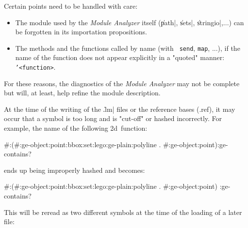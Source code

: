 

Certain points need to be handled with care:

\begin{itemize}

\item The module used by the {\em Module Analyzer} itself
(\|path|, \|sets|, \|stringio|,...) 
can be forgotten in its importation propositions.

\item The methods and the functions called by name (with {\tt
send}, {\tt map}, ...), if the name of the function 
does not appear explicitly in a "quoted" manner:  {\tt '<function>}.

\end{itemize}

For these reasons, the diagnostics of the {\em Module Analyzer} 
may not be complete but will, at least, help refine the module description.





At the time of the writing of the \|.lm| files or the reference bases (.ref), it may occur that a symbol is too long and is "cut-off" or hashed incorrectly.
For example, the name of the following \Masai2d\ function:

\begin{Longcode*}
#:(#:ge-object:point:bbox:set:lego:ge-plain:polyline . #:ge-object:point):ge-contains?
\end{Longcode*}

ends up being improperly hashed and becomes:

\begin{Longcode*}
#:(#:ge-object:point:bbox:set:lego:ge-plain:polyline . #:ge-object:point)
:ge-contains?
\end{Longcode*}

This will be reread as two different symbols at the time of the loading of a later file:

